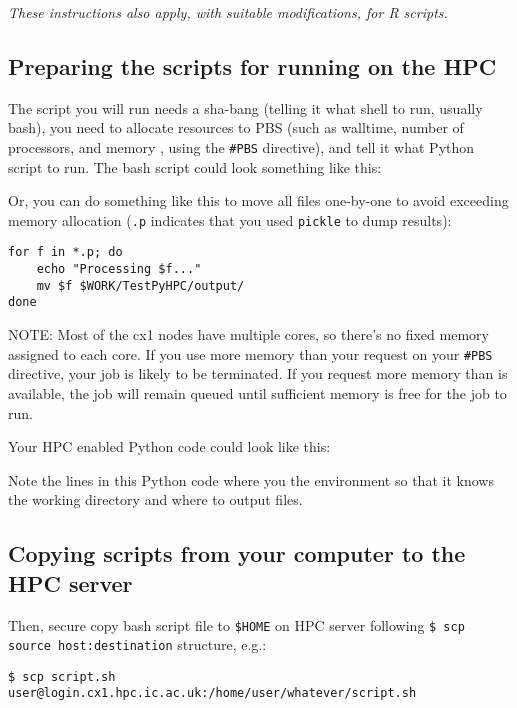 {\it These instructions also apply, with suitable modifications, for R 
scripts.}

\subsection{Preparing the scripts for running on the HPC}

The script you will run needs a sha-bang (telling it what shell to run, 
usually bash), you need to allocate resources to PBS (such as walltime, 
number of processors, and memory , using the {\tt \#PBS} directive), and tell it what Python script to run. The bash script could look something like this:



Or, you can do something like this to move all files one-by-one to 
avoid exceeding memory allocation ({\tt *.p} indicates that you used 
{\tt pickle} to dump results):

\begin{lstlisting}
for f in *.p; do
	echo "Processing $f..."
	mv $f $WORK/TestPyHPC/output/
done
\end{lstlisting}

NOTE: Most of the cx1 nodes have multiple cores, so there's no fixed memory assigned to each core. If you use more memory than your request on your {\tt \#PBS} directive, your job is likely to be terminated. If you request more memory than is available, the job will remain queued until sufficient memory is free for the job to run.

Your HPC enabled Python code could look like this:



Note the lines in this Python code where you  the environment so that it
knows the working directory and where to output files.

\subsection{Copying scripts from your computer to the HPC server}
 
Then, secure copy bash script file to {\tt \$HOME} on HPC server following
{\tt \$ scp source host:destination} structure, e.g.:

\begin{lstlisting}
$ scp script.sh user@login.cx1.hpc.ic.ac.uk:/home/user/whatever/script.sh
\end{lstlisting}

